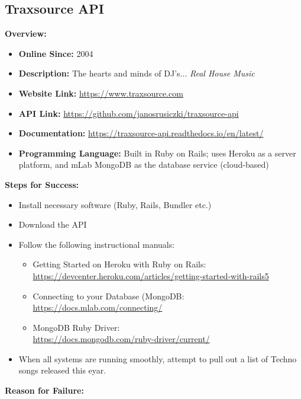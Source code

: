 \documentclass{article}
\begin{document}
\subsection{Traxsource API}
\textbf{Overview:}
\begin{itemize}
    \item \textbf{Online Since:} 2004
    \item \textbf{Description:} The hearts and minds of DJ's... \textit{Real House Music}
    \item \textbf{Website Link:} \url{https://www.traxsource.com}
    \item \textbf{API Link:} \url{https://github.com/janosrusiczki/traxsource-api}
    \item \textbf{Documentation:} \url{https://traxsource-api.readthedocs.io/en/latest/}
    \item \textbf{Programming Language:} Built in Ruby on Rails; uses Heroku as a server platform, and mLab MongoDB as the database service (cloud-based)
\end{itemize}
\textbf{Steps for Success:}
\begin{itemize}
    \item Install necessary software (Ruby, Rails, Bundler etc.)
    \item Download the API
    \item Follow the following instructional manuals:
    \begin{itemize}
        \item Getting Started on Heroku with Ruby on Rails:\\
        \url{https://devcenter.heroku.com/articles/getting-started-with-rails5}
        \item Connecting to your Database (MongoDB:\\
        \url{https://docs.mlab.com/connecting/}
        \item MongoDB Ruby Driver:\\
        \url{https://docs.mongodb.com/ruby-driver/current/}
    \end{itemize}
    \item When all systems are running smoothly, attempt to pull out a list of Techno songs released this eyar.
\end{itemize}
\textbf{Reason for Failure:}
\end{document}
